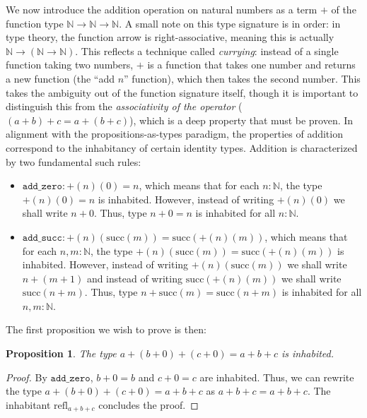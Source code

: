 \documentclass[12pt]{article}
\newtheorem{proposition}{Proposition}[section]
\theoremstyle{definition}
\theoremstyle{remark}
\newcommand{\doublequotes}[1]{``#1''}
\begin{document}
We now introduce the addition operation on natural numbers as a term $+$ of the function type $\mathbb{N} \to \mathbb{N} \to \mathbb{N}$. A small note on this type signature is in order: in type theory, the function arrow is right-associative, meaning this is actually $\mathbb{N} \to (\mathbb{N} \to \mathbb{N})$. This reflects a technique called \textit{currying}: instead of a single function taking two numbers, $+$ is a function that takes one number and returns a new function (the \doublequotes{add $n$} function), which then takes the second number. This takes the ambiguity out of the function signature itself, though it is important to distinguish this from the \textit{associativity of the operator} ($ (a+b)+c = a+(b+c) $), which is a deep property that must be proven. In alignment with the propositions-as-types paradigm, the properties of addition correspond to the inhabitancy of certain identity types. Addition is characterized by two fundamental such rules:
\begin{itemize}
  \item $\texttt{add\_zero}: +(n)(0) = n$, which means that for each $n : \mathbb{N}$, the type $+(n)(0) = n$ is inhabited. However, instead of writing $+(n)(0)$ we shall write $n+0$. Thus, type $n+0 = n$ is inhabited for all $n : \mathbb{N}$.
  \item $\texttt{add\_succ}: +(n)(\text{succ}(m)) = \text{succ}(+(n)(m))$, which means that for each $n, m : \mathbb{N}$, the type $+(n)(\text{succ}(m)) = \text{succ}(+(n)(m))$ is inhabited. However, instead of writing $+(n)(\text{succ}(m))$ we shall write $n+(m+1)$ and instead of writing $\text{succ}(+(n)(m))$ we shall write $\text{succ}(n+m)$. Thus, type $n+\text{succ}(m) = \text{succ}(n+m)$ is inhabited for all $n, m : \mathbb{N}$.
\end{itemize}

The first proposition we wish to prove is then:

\begin{proposition}
  The type $a+(b+0)+(c+0) = a+b+c$ is inhabited.
\end{proposition}
\begin{proof}
  By $\texttt{add\_zero}$, $b+0 = b$ and $c+0 = c$ are inhabited. Thus, we can rewrite the type $a+(b+0)+(c+0) = a+b+c$ as $a+b+c = a+b+c$.
  The inhabitant $\text{refl}_{a+b+c}$ concludes the proof.
\end{proof}
\end{document}
